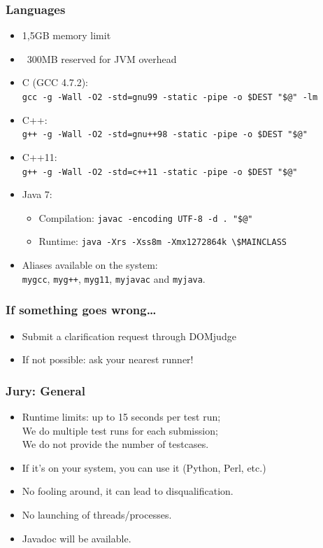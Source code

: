 \documentclass[t]{beamer}
\begin{document}
\begin{frame}[fragile]
	\frametitle{Languages}
	\begin{itemize}
		\item 1,5GB memory limit
		\item ~300MB reserved for JVM overhead
		\item C (GCC 4.7.2):\\    \lstinline|gcc -g -Wall -O2 -std=gnu99 -static -pipe -o $DEST "$@" -lm|
		\item C++:\\  \lstinline|g++ -g -Wall -O2 -std=gnu++98 -static -pipe -o $DEST "$@"|
		\item C++11:\\\lstinline|g++ -g -Wall -O2 -std=c++11 -static -pipe -o $DEST "$@"|
		\item Java 7:
		\begin{itemize}
			\item Compilation: \lstinline|javac -encoding UTF-8 -d . "$@"|
			\item Runtime: \lstinline|java -Xrs -Xss8m -Xmx1272864k \$MAINCLASS|
		\end{itemize}
		\item Aliases available on the system:\\
		\lstinline|mygcc|, \lstinline|myg++|, \lstinline|myg11|, \lstinline|myjavac| and \lstinline|myjava|.
	\end{itemize}
\end{frame}
\begin{frame}
	\frametitle{If something goes wrong\ldots}
	\begin{itemize}
		\item Submit a clarification request through DOMjudge
		\item If not possible: ask your nearest runner!
	\end{itemize}
\end{frame}
\begin{frame}
    \frametitle{Jury: General}
    \begin{itemize}
        \item Runtime limits: up to 15 seconds per test run;\\
              We do multiple test runs for each submission;\\
              We do not provide the number of testcases.
        \item If it's on your system, you can use it (Python, Perl, etc.)
        \item No fooling around, it can lead to disqualification.
        \item No launching of threads/processes.
        \item Javadoc will be available.
    \end{itemize}
\end{frame}
\end{document}
